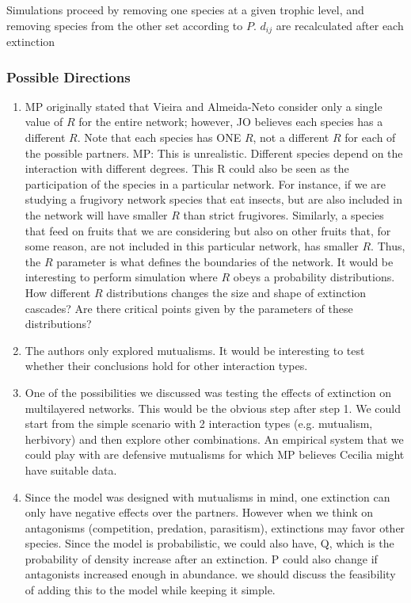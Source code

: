 \documentclass[12pt]{article}
\begin{document}
Simulations proceed by removing one species at a given trophic level, and removing species from the other set according to $P$. $d_{ij}$ are recalculated after each extinction


\subsubsection*{Possible Directions}

\begin{enumerate}
	\item MP originally stated that Vieira and Almeida-Neto consider only a single value of $R$ for the entire network; however, JO believes each species has a different $R$. Note that each species has ONE $R$, not a different $R$ for each of the possible partners. MP: This is unrealistic. Different species depend on the interaction with different degrees. This R could also be seen as the participation of the species in a particular network. For instance, if we are studying a frugivory network species that eat insects, but are also included in the network will have smaller $R$ than strict frugivores. Similarly, a species that feed on fruits that we are considering but also on other fruits that, for some reason, are not included in this particular network, has smaller $R$.  Thus, the $R$ parameter is what defines the boundaries of the network. It would be interesting to perform simulation where $R$ obeys a probability distributions. How different $R$ distributions changes the size and shape of extinction cascades? Are there critical points given by the parameters of these distributions?

	\item The authors only explored mutualisms. It would be interesting to test whether their conclusions hold for other interaction types.

	\item One of the possibilities we discussed was testing the effects of extinction on multilayered networks. This would be the obvious step after step 1. We could start from the simple scenario with 2 interaction types (e.g. mutualism, herbivory) and then explore other combinations. An empirical system that we could play with are defensive mutualisms for which MP believes Cecilia might have suitable data.

	\item Since the model was designed with mutualisms in mind, one extinction can only have negative effects over the partners. However when we think on antagonisms (competition, predation, parasitism), extinctions may favor other species. Since the model is probabilistic, we could also have, Q, which is the probability of density increase after an extinction. P could also change if antagonists increased enough in abundance. we should discuss the feasibility of adding this to the model while keeping it simple.

\end{enumerate}
\end{document}
